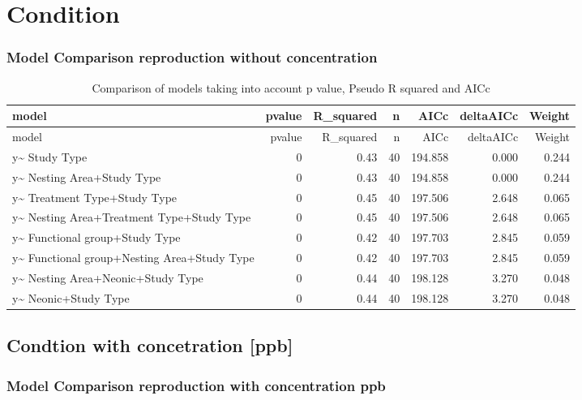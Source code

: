 \documentclass[]{elsarticle} %
\begin{document}
\section{Condition}\label{condition}

\subsubsection{Model Comparison reproduction without
concentration}\label{model-comparison-reproduction-without-concentration-1}

\begin{longtable}[c]{@{}lrrrrrr@{}}
\caption{Comparison of models taking into account p value, Pseudo R
squared and AICc}\tabularnewline
\toprule
model & pvalue & R\_squared & n & AICc & deltaAICc &
Weight\tabularnewline
\midrule
\endfirsthead
\toprule
model & pvalue & R\_squared & n & AICc & deltaAICc &
Weight\tabularnewline
\midrule
\endhead
y\textasciitilde{} Study Type & 0 & 0.43 & 40 & 194.858 & 0.000 &
0.244\tabularnewline
y\textasciitilde{} Nesting Area+Study Type & 0 & 0.43 & 40 & 194.858 &
0.000 & 0.244\tabularnewline
y\textasciitilde{} Treatment Type+Study Type & 0 & 0.45 & 40 & 197.506 &
2.648 & 0.065\tabularnewline
y\textasciitilde{} Nesting Area+Treatment Type+Study Type & 0 & 0.45 &
40 & 197.506 & 2.648 & 0.065\tabularnewline
y\textasciitilde{} Functional group+Study Type & 0 & 0.42 & 40 & 197.703
& 2.845 & 0.059\tabularnewline
y\textasciitilde{} Functional group+Nesting Area+Study Type & 0 & 0.42 &
40 & 197.703 & 2.845 & 0.059\tabularnewline
y\textasciitilde{} Nesting Area+Neonic+Study Type & 0 & 0.44 & 40 &
198.128 & 3.270 & 0.048\tabularnewline
y\textasciitilde{} Neonic+Study Type & 0 & 0.44 & 40 & 198.128 & 3.270 &
0.048\tabularnewline
\bottomrule
\end{longtable}

\subsection{Condtion with concetration
{[}ppb{]}}\label{condtion-with-concetration-ppb}

\subsubsection{Model Comparison reproduction with concentration
ppb}\label{model-comparison-reproduction-with-concentration-ppb-1}
\end{document}
